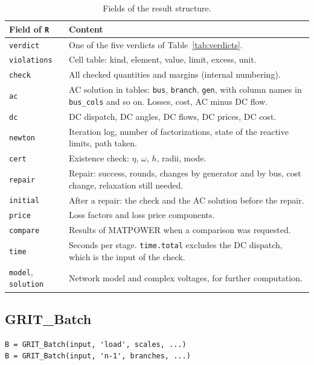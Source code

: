\documentclass[a4paper,11pt]{article}
\begin{document}
\begin{table}[H]\centering\small
\begin{tabular}{@{}lp{11cm}@{}}
\toprule
\textbf{Field of \texttt{R}} & \textbf{Content} \\
\midrule
\texttt{verdict} & One of the five verdicts of Table~\ref{tab:verdicts}. \\
\texttt{violations} & Cell table: kind, element, value, limit, excess, unit. \\
\texttt{check} & All checked quantities and margins (internal numbering). \\
\texttt{ac} & AC solution in tables: \texttt{bus}, \texttt{branch}, \texttt{gen}, with column names in \texttt{bus\_cols} and so on. Losses, cost, AC minus DC flow. \\
\texttt{dc} & DC dispatch, DC angles, DC flows, DC prices, DC cost. \\
\texttt{newton} & Iteration log, number of factorizations, state of the reactive limits, path taken. \\
\texttt{cert} & Existence check: $\eta$, $\omega$, $h$, radii, mode. \\
\texttt{repair} & Repair: success, rounds, changes by generator and by bus, cost change, relaxation still needed. \\
\texttt{initial} & After a repair: the check and the AC solution before the repair. \\
\texttt{price} & Loss factors and loss price components. \\
\texttt{compare} & Results of MATPOWER when a comparison was requested. \\
\texttt{time} & Seconds per stage. \texttt{time.total} excludes the DC dispatch, which is the input of the check. \\
\texttt{model}, \texttt{solution} & Network model and complex voltages, for further computation. \\
\bottomrule
\end{tabular}
\caption{Fields of the result structure.}
\end{table}

\subsection{GRIT\_Batch}\label{sec:batch}

\begin{lstlisting}
B = GRIT_Batch(input, 'load', scales, ...)
B = GRIT_Batch(input, 'n-1', branches, ...)
\end{lstlisting}
\end{document}
